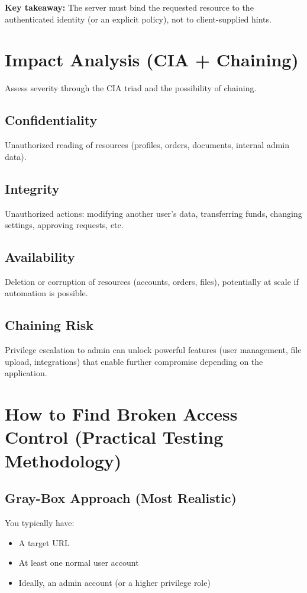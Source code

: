 \documentclass[11pt]{article}
\newcommand{\KeyTakeaway}[1]{%
  \vspace{0.5em}
  \noindent\textbf{Key takeaway:} #1
  \vspace{0.5em}
}
\begin{document}
\KeyTakeaway{The server must bind the requested resource to the authenticated identity (or an explicit policy), not to client-supplied hints.}

\section{Impact Analysis (CIA + Chaining)}
Assess severity through the CIA triad and the possibility of chaining.

\subsection{Confidentiality}
Unauthorized reading of resources (profiles, orders, documents, internal admin data).

\subsection{Integrity}
Unauthorized actions: modifying another user's data, transferring funds, changing settings, approving requests, etc.

\subsection{Availability}
Deletion or corruption of resources (accounts, orders, files), potentially at scale if automation is possible.

\subsection{Chaining Risk}
Privilege escalation to admin can unlock powerful features (user management, file upload, integrations) that enable further compromise depending on the application.

\section{How to Find Broken Access Control (Practical Testing Methodology)}
\subsection{Gray-Box Approach (Most Realistic)}
You typically have:
\begin{itemize}
  \item A target URL
  \item At least one normal user account
  \item Ideally, an admin account (or a higher privilege role)
\end{itemize}
\end{document}
